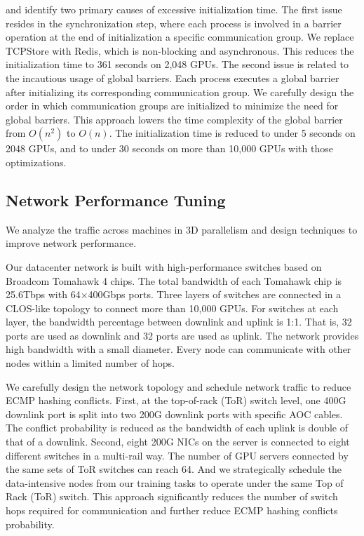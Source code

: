  and identify two primary causes of excessive
initialization time. The first issue resides in the synchronization step, where
each process is involved in a barrier operation at the end of initialization a
specific communication group.  We replace TCPStore
with Redis, which is non-blocking and asynchronous. This reduces the
initialization time to 361 seconds on 2,048 GPUs. The second issue is related to
the incautious usage of global barriers. Each process executes a global barrier
after initializing its corresponding communication group. We carefully design
the order in which communication groups are initialized to minimize the need for
global barriers. This approach lowers the time complexity of the global barrier from $O(n^2)$ to $O(n)$. The initialization time is reduced to under 5 seconds on 2048 GPUs, and to under 30 seconds on more than 10,000 GPUs with those optimizations.

\subsection{Network Performance Tuning}

We analyze the traffic across machines in 3D parallelism and design techniques to improve network performance.

 Our datacenter network is built with high-performance
switches based on Broadcom Tomahawk 4 chips. The total bandwidth of each Tomahawk
chip is 25.6Tbps with 64$\times$400Gbps ports. Three layers of switches are
connected in a CLOS-like topology to connect more than 10,000 GPUs. For switches
at each layer, the bandwidth percentage between downlink and uplink is 1:1. That
is, 32 ports are used as downlink and 32 ports are used as uplink. The network
provides high bandwidth with a small diameter. Every node can communicate with
other nodes within a limited number of hops.   

We carefully design the network topology and schedule network traffic to reduce ECMP hashing conflicts. First, at the
top-of-rack (ToR) switch level, one 400G downlink port is split into two 200G
downlink ports with specific AOC cables. The conflict
probability is reduced as the bandwidth of each uplink is double of that
of a downlink. Second, eight 200G NICs on the server
is connected to eight different switches in a multi-rail way. The number of GPU
servers connected by the same sets of ToR switches can reach 64. And we strategically schedule the data-intensive nodes from our training tasks to operate under the same Top of Rack (ToR) switch. This approach significantly reduces the number of switch hops required for communication and further reduce ECMP hashing conflicts probability.


